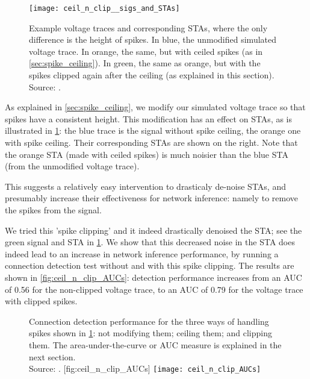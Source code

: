 \begin{figure}
    \texttt{[image: ceil\_n\_clip\_\_sigs\_and\_STAs]}
    \caption
        {Example voltage traces and corresponding STAs, where the only difference is the height of spikes. In blue, the unmodified simulated voltage trace. In orange, the same, but with ceiled spikes (as in \cref{sec:spike_ceiling}). In green, the same as orange, but with the spikes clipped again after the ceiling (as explained in this section).\\
        Source: .}
    \label{fig:ceil_n_clip__sigs_and_STAs}
\end{figure}

As explained in \cref{sec:spike_ceiling}, we modify our simulated voltage trace so that spikes have a consistent height. This modification has an effect on STAs, as is illustrated in \cref{fig:ceil_n_clip__sigs_and_STAs}: the blue trace is the signal without spike ceiling, the orange one with spike ceiling. Their corresponding STAs are shown on the right. Note that the orange STA (made with ceiled spikes) is much noisier than the blue STA (from the unmodified voltage trace).

This suggests a relatively easy intervention to drasticaly de-noise STAs, and presumably increase their effectiveness for network inference: namely to remove the spikes from the signal.

We tried this 'spike clipping' and it indeed drastically denoised the STA; see the green signal and STA in \cref{fig:ceil_n_clip__sigs_and_STAs}.
We show that this decreased noise in the STA does indeed lead to an increase in network inference performance, by running a connection detection test without and with this spike clipping. The results are shown in \cref{fig:ceil_n_clip_AUCs}: detection performance increases from an AUC of 0.56 for the non-clipped voltage trace, to an AUC of 0.79 for the voltage trace with clipped spikes.

\begin{figure}
    \begin{sidecaption}
        {
            Connection detection performance for the three ways of handling spikes shown in \cref{fig:ceil_n_clip__sigs_and_STAs}: not modifying them; ceiling them; and clipping them.
            The area-under-the-curve or AUC measure is explained in the next section.\\
            Source: .
        }
        [fig:ceil_n_clip_AUCs]
        \texttt{[image: ceil\_n\_clip\_AUCs]}
    \end{sidecaption}
\end{figure}
%


